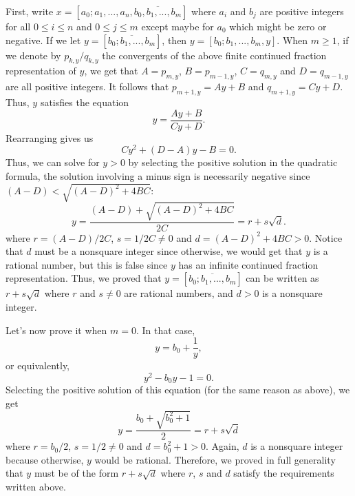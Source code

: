 \begin{solution}
    First, write $x = [a_0; a_1, ..., a_n, \overline{b_0, b_1, ..., b_m}]$ where $a_i$ and $b_j$ are positive integers for all $0\leq i \leq n$ and $0 \leq j \leq m$ except maybe for $a_0$ which might be zero or negative. If we let $y = [\overline{b_0; b_1, ..., b_m}]$, then $y = [b_0; b_1, ..., b_m, y]$. When $m \geq 1$, if we denote by $p_{k,y}/q_{k,y}$ the convergents of the above finite continued fraction representation of $y$, we get that $A = p_{m,y}$, $B = p_{m-1,y}$, $C = q_{m,y}$ and $D = q_{m-1,y}$ are all positive integers. It follows that $p_{m+1,y} = Ay + B$ and $q_{m+1,y} = Cy + D$. Thus, $y$ satisfies the equation
    $$y = \frac{Ay + B}{Cy + D}.$$
    Rearranging gives us
    $$Cy^2 + (D-A)y - B = 0.$$
    Thus, we can solve for $y > 0$ by selecting the positive solution in the quadratic formula, the solution involving a minus sign is necessarily negative since $(A-D) < \sqrt{(A-D)^2 + 4BC}$:
    $$y = \frac{(A-D) + \sqrt{(A-D)^2 + 4BC}}{2C} = r + s\sqrt{d}.$$
    where $r = (A-D)/2C$, $s = 1/2C \neq 0$ and $d = (A-D)^2 + 4BC > 0$. Notice that $d$ must be a nonsquare integer since otherwise, we would get that $y$ is a rational number, but this is false since $y$ has an infinite continued fraction representation. Thus, we proved that $y = [\overline{b_0; b_1, ..., b_m}]$ can be written as $r + s\sqrt{d}$ where $r$ and $s \neq 0$ are rational numbers, and $d>0$ is a nonsquare integer. 

    Let's now prove it when $m = 0$. In that case,
    $$y = b_0 + \frac{1}{y},$$
    or equivalently,
    $$y^2 - b_0y - 1 = 0.$$
    Selecting the positive solution of this equation (for the same reason as above), we get
    $$y = \frac{b_0 + \sqrt{b_0^2 + 1}}{2} = r + s\sqrt{d}$$
    where $r = b_0/2$, $s = 1/2 \neq 0$ and $d = b_0^2 + 1 > 0$. Again, $d$ is a nonsquare integer because otherwise, $y$ would be rational. Therefore, we proved in full generality that $y$ must be of the form $r + s\sqrt{d}$ where $r$, $s$ and $d$ satisfy the requirements written above.


\end{solution}
